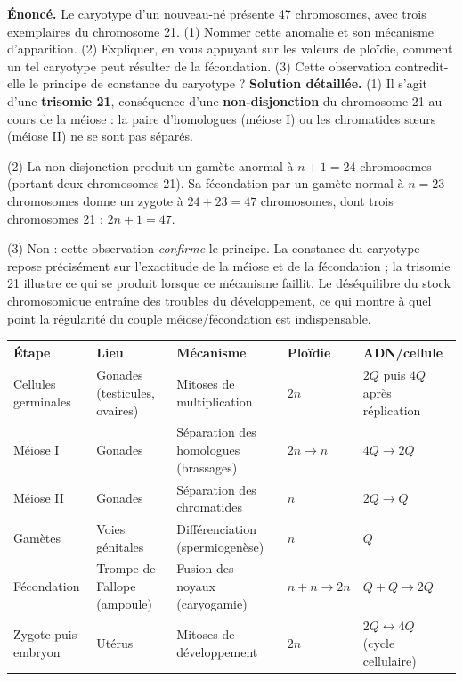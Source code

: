 \documentclass[11pt]{article}
\newcounter{popsec}
\newcounter{popsub}
\newcommand{\courssub}[1]{%
  \stepcounter{popsub}%
  \par\vspace{9pt}\noindent{\popxbold\fontsize{11.5}{13}\selectfont\color{popink}{\color{poporange}\thepopsec.\thepopsub}\hspace{6pt}#1}\par\nopagebreak\vspace{4pt}
}
\begin{document}
\begin{exoresolu}
\textbf{Énoncé.} Le caryotype d'un nouveau-né présente 47 chromosomes, avec trois exemplaires du chromosome 21. (1) Nommer cette anomalie et son mécanisme d'apparition. (2) Expliquer, en vous appuyant sur les valeurs de ploïdie, comment un tel caryotype peut résulter de la fécondation. (3) Cette observation contredit-elle le principe de constance du caryotype ?
\tcblower
\textbf{Solution détaillée.}
(1) Il s'agit d'une \textbf{trisomie 21}, conséquence d'une \textbf{non-disjonction} du chromosome 21 au cours de la méiose : la paire d'homologues (méiose I) ou les chromatides s\oe urs (méiose II) ne se sont pas séparés.

(2) La non-disjonction produit un gamète anormal à $n+1 = 24$ chromosomes (portant deux chromosomes 21). Sa fécondation par un gamète normal à $n = 23$ chromosomes donne un zygote à $24 + 23 = 47$ chromosomes, dont trois chromosomes 21 : $2n+1 = 47$.

(3) Non : cette observation \emph{confirme} le principe. La constance du caryotype repose précisément sur l'exactitude de la méiose et de la fécondation ; la trisomie 21 illustre ce qui se produit lorsque ce mécanisme faillit. Le déséquilibre du stock chromosomique entraîne des troubles du développement, ce qui montre à quel point la régularité du couple méiose/fécondation est indispensable.
\end{exoresolu}

\courssub{Tableau de synthèse final}

\begin{center}
\begin{tabularx}{\linewidth}{|l|X|X|X|X|}
\hline
\rowcolor{popblueL} \textbf{Étape} & \textbf{Lieu} & \textbf{Mécanisme} & \textbf{Ploïdie} & \textbf{ADN/cellule} \\
\hline
Cellules germinales & Gonades (testicules, ovaires) & Mitoses de multiplication & $2n$ & $2Q$ puis $4Q$ après réplication \\
\hline
Méiose I & Gonades & Séparation des homologues (brassages) & $2n \rightarrow n$ & $4Q \rightarrow 2Q$ \\
\hline
Méiose II & Gonades & Séparation des chromatides & $n$ & $2Q \rightarrow Q$ \\
\hline
Gamètes & Voies génitales & Différenciation (spermiogenèse) & $n$ & $Q$ \\
\hline
Fécondation & Trompe de Fallope (ampoule) & Fusion des noyaux (caryogamie) & $n + n \rightarrow 2n$ & $Q + Q \rightarrow 2Q$ \\
\hline
Zygote puis embryon & Utérus & Mitoses de développement & $2n$ & $2Q \leftrightarrow 4Q$ (cycle cellulaire) \\
\hline
\end{tabularx}
\end{center}
\end{document}
